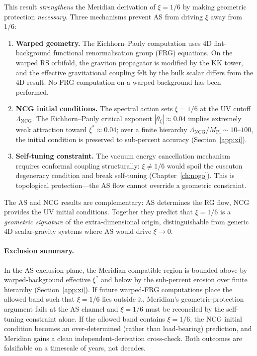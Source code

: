 This result \emph{strengthens} the Meridian derivation of $\xi = 1/6$ by making geometric protection \emph{necessary}. Three mechanisms prevent AS from driving $\xi$ away from $1/6$:
\begin{enumerate}
  \item \textbf{Warped geometry.} The Eichhorn--Pauly computation uses 4D flat-background functional renormalisation group (FRG) equations. On the warped RS orbifold, the graviton propagator is modified by the KK tower, and the effective gravitational coupling felt by the bulk scalar differs from the 4D result. No FRG computation on a warped background has been performed.
  \item \textbf{NCG initial conditions.} The spectral action sets $\xi = 1/6$ at the UV cutoff $\Lambda_\mathrm{NCG}$. The Eichhorn--Pauly critical exponent $|\theta_\xi| \approx 0.04$ implies extremely weak attraction toward $\xi^* \approx 0.04$; over a finite hierarchy $\Lambda_\mathrm{NCG}/M_\mathrm{Pl} \sim 10$--$100$, the initial condition is preserved to sub-percent accuracy (Section~\ref{app:xi}).
  \item \textbf{Self-tuning constraint.} The vacuum energy cancellation mechanism requires conformal coupling structurally: $\xi \neq 1/6$ would spoil the cuscuton degeneracy condition and break self-tuning (Chapter~\ref{ch:nogo}). This is topological protection---the AS flow cannot override a geometric constraint.
\end{enumerate}
The AS and NCG results are complementary: AS determines the RG flow, NCG provides the UV initial conditions. Together they predict that $\xi = 1/6$ is a \emph{geometric signature} of the extra-dimensional origin, distinguishable from generic 4D scalar-gravity systems where AS would drive $\xi \to 0$.

\paragraph{Exclusion summary.} In the AS exclusion plane, the Meridian-compatible region is bounded above by warped-background effective $\xi^*$ and below by the sub-percent erosion over finite hierarchy (Section~\ref{app:xi}). If future warped-FRG computations place the allowed band such that $\xi = 1/6$ lies outside it, Meridian's geometric-protection argument fails at the AS channel and $\xi = 1/6$ must be reconciled by the self-tuning constraint alone. If the allowed band contains $\xi = 1/6$, the NCG initial condition becomes an over-determined (rather than load-bearing) prediction, and Meridian gains a clean independent-derivation cross-check. Both outcomes are falsifiable on a timescale of years, not decades.


